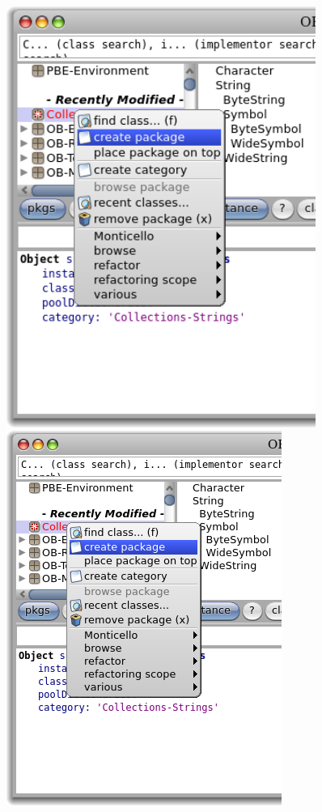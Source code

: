 \documentclass[a4paper,10pt,twoside]{book}
\begin{document}
\begin{figure}[htb]
\begin{minipage}[b]{0.48\textwidth}
\ifluluelse
	{\centerline {\includegraphics[width=0.9\textwidth]{AddPackage}}}
	{\centerline {\includegraphics[scale=0.7]{AddPackage}}}

\end{minipage}
\end{figure}
\end{document}
